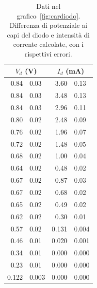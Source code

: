 \documentclass[italian,a4paper]{article}
\begin{document}
\begin{table}[p]\caption{Dati nel grafico~\ref{fig:cardiodo}. Differenza di
    potenziale ai capi del diodo e intensità di corrente calcolate, con i
    rispettivi errori.}\label{tab:cardiodo}
        \centering
        \begin{tabular}{r@{ $\pm$ }l r@{ $\pm$ }l}
                \multicolumn{2}{c}{$V_d$ (\unit{V})} &
                \multicolumn{2}{c}{$I_d$ (\unit{mA})} \\\hline
                0.84 & 0.03 & 3.60 & 0.13\\
                0.84 & 0.03 & 3.48 & 0.13\\
                0.84 & 0.03 & 2.96 & 0.11\\
                0.80 & 0.02 & 2.48 & 0.09\\
                0.76 & 0.02 & 1.96 & 0.07\\
                0.72 & 0.02 & 1.48 & 0.05\\
                0.68 & 0.02 & 1.00 & 0.04\\
                0.64 & 0.02 & 0.48 & 0.02\\
                0.67 & 0.02 & 0.87 & 0.03\\
                0.67 & 0.02 & 0.68 & 0.02\\
                0.65 & 0.02 & 0.49 & 0.02\\
                0.62 & 0.02 & 0.30 & 0.01\\
                0.57 & 0.02 & 0.131 & 0.004\\
                0.46 & 0.01 & 0.020 & 0.001\\
                0.34 & 0.01 & 0.000 & 0.000\\
                0.23 & 0.01 & 0.000 & 0.000\\
                0.122 & 0.003 & 0.000 & 0.000\\
            \end{tabular}
                \end{table}
\end{document}
